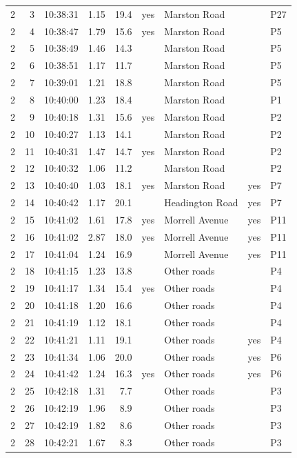 \begin{longtable}{@{}rrlrrllll@{}}
2 & 3 & 10:38:31 & 1.15 & 19.4 & yes & Marston Road &  & P27 \\
2 & 4 & 10:38:47 & 1.79 & 15.6 & yes & Marston Road &  & P5 \\
2 & 5 & 10:38:49 & 1.46 & 14.3 &  & Marston Road &  & P5 \\
2 & 6 & 10:38:51 & 1.17 & 11.7 &  & Marston Road &  & P5 \\
2 & 7 & 10:39:01 & 1.21 & 18.8 &  & Marston Road &  & P5 \\
2 & 8 & 10:40:00 & 1.23 & 18.4 &  & Marston Road &  & P1 \\
2 & 9 & 10:40:18 & 1.31 & 15.6 & yes & Marston Road &  & P2 \\
2 & 10 & 10:40:27 & 1.13 & 14.1 &  & Marston Road &  & P2 \\
2 & 11 & 10:40:31 & 1.47 & 14.7 & yes & Marston Road &  & P2 \\
2 & 12 & 10:40:32 & 1.06 & 11.2 &  & Marston Road &  & P2 \\
2 & 13 & 10:40:40 & 1.03 & 18.1 & yes & Marston Road & yes & P7 \\
2 & 14 & 10:40:42 & 1.17 & 20.1 &  & Headington Road & yes & P7 \\
2 & 15 & 10:41:02 & 1.61 & 17.8 & yes & Morrell Avenue & yes & P11 \\
2 & 16 & 10:41:02 & 2.87 & 18.0 & yes & Morrell Avenue & yes & P11 \\
2 & 17 & 10:41:04 & 1.24 & 16.9 &  & Morrell Avenue & yes & P11 \\
2 & 18 & 10:41:15 & 1.23 & 13.8 &  & Other roads &  & P4 \\
2 & 19 & 10:41:17 & 1.34 & 15.4 & yes & Other roads &  & P4 \\
2 & 20 & 10:41:18 & 1.20 & 16.6 &  & Other roads &  & P4 \\
2 & 21 & 10:41:19 & 1.12 & 18.1 &  & Other roads &  & P4 \\
2 & 22 & 10:41:21 & 1.11 & 19.1 &  & Other roads & yes & P4 \\
2 & 23 & 10:41:34 & 1.06 & 20.0 &  & Other roads & yes & P6 \\
2 & 24 & 10:41:42 & 1.24 & 16.3 & yes & Other roads & yes & P6 \\
2 & 25 & 10:42:18 & 1.31 & 7.7 &  & Other roads &  & P3 \\
2 & 26 & 10:42:19 & 1.96 & 8.9 &  & Other roads &  & P3 \\
2 & 27 & 10:42:19 & 1.82 & 8.6 &  & Other roads &  & P3 \\
2 & 28 & 10:42:21 & 1.67 & 8.3 &  & Other roads &  & P3 \\

\end{longtable}
